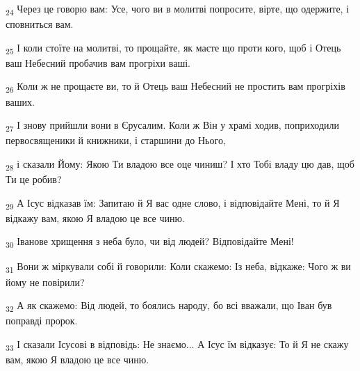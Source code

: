 \begin{tcolorbox}
\textsubscript{24} Через це говорю вам: Усе, чого ви в молитві попросите, вірте, що одержите, і сповниться вам.
\end{tcolorbox}
\begin{tcolorbox}
\textsubscript{25} І коли стоїте на молитві, то прощайте, як маєте що проти кого, щоб і Отець ваш Небесний пробачив вам прогріхи ваші.
\end{tcolorbox}
\begin{tcolorbox}
\textsubscript{26} Коли ж не прощаєте ви, то й Отець ваш Небесний не простить вам прогріхів ваших.
\end{tcolorbox}
\begin{tcolorbox}
\textsubscript{27} І знову прийшли вони в Єрусалим. Коли ж Він у храмі ходив, поприходили первосвященики й книжники, і старшини до Нього,
\end{tcolorbox}
\begin{tcolorbox}
\textsubscript{28} і сказали Йому: Якою Ти владою все оце чиниш? І хто Тобі владу цю дав, щоб Ти це робив?
\end{tcolorbox}
\begin{tcolorbox}
\textsubscript{29} А Ісус відказав їм: Запитаю й Я вас одне слово, і відповідайте Мені, то й Я відкажу вам, якою Я владою це все чиню.
\end{tcolorbox}
\begin{tcolorbox}
\textsubscript{30} Іванове хрищення з неба було, чи від людей? Відповідайте Мені!
\end{tcolorbox}
\begin{tcolorbox}
\textsubscript{31} Вони ж міркували собі й говорили: Коли скажемо: Із неба, відкаже: Чого ж ви йому не повірили?
\end{tcolorbox}
\begin{tcolorbox}
\textsubscript{32} А як скажемо: Від людей, то боялись народу, бо всі вважали, що Іван був поправді пророк.
\end{tcolorbox}
\begin{tcolorbox}
\textsubscript{33} І сказали Ісусові в відповідь: Не знаємо... А Ісус їм відказує: То й Я не скажу вам, якою Я владою це все чиню.
\end{tcolorbox}
